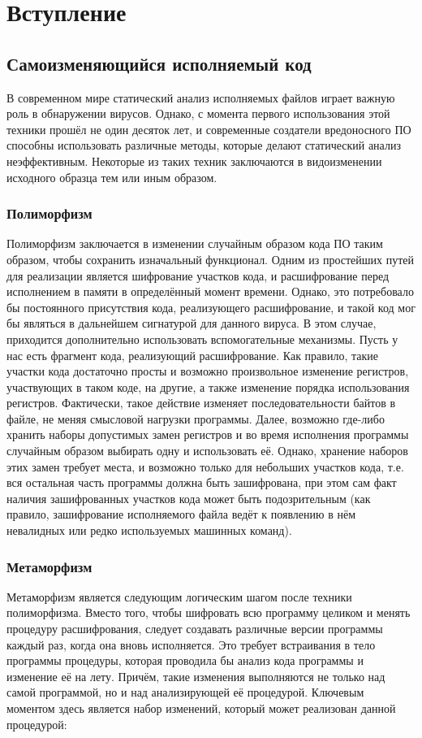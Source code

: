 \section {Вступление}
\subsection {Самоизменяющийся исполняемый код}
В современном мире статический анализ исполняемых файлов играет важную роль в обнаружении вирусов. Однако, с момента первого использования этой техники прошёл не один десяток лет, и современные создатели вредоносного ПО способны использовать  различные методы, которые делают статический анализ неэффективным. Некоторые из таких техник заключаются в видоизменении исходного образца тем или иным образом. 
\subsubsection {Полиморфизм}
Полиморфизм заключается в изменении случайным образом кода ПО таким образом, чтобы сохранить изначальный функционал. Одним из простейших путей для реализации является шифрование участков кода, и расшифрование перед исполнением в памяти в определённый момент времени. Однако, это потребовало бы постоянного присутствия кода, реализующего расшифрование, и такой код мог бы являться в дальнейшем сигнатурой для данного вируса. В этом случае, приходится дополнительно использовать вспомогательные механизмы. Пусть у нас есть фрагмент кода, реализующий расшифрование. Как правило, такие участки кода достаточно просты и возможно произвольное изменение регистров, участвующих в таком коде, на другие, а также изменение порядка использования регистров. Фактически, такое действие изменяет последовательности байтов в файле, не меняя смысловой нагрузки программы. Далее, возможно где-либо хранить наборы допустимых замен регистров и во время исполнения программы случайным образом выбирать одну и использовать её. Однако, хранение наборов этих замен требует места, и возможно только для небольших участков кода, т.е. вся остальная часть программы должна быть зашифрована, при этом сам факт наличия зашифрованных участков кода может быть подозрительным (как правило, зашифрование исполняемого файла ведёт к появлению в нём невалидных или редко используемых машинных команд).
\subsubsection {Метаморфизм}
Метаморфизм является следующим логическим шагом после техники полиморфизма. Вместо того, чтобы шифровать всю программу целиком и менять процедуру расшифрования, следует создавать различные версии программы каждый раз, когда она вновь исполняется. Это требует встраивания в тело программы процедуры, которая проводила бы анализ кода программы и изменение её на лету. Причём, такие изменения выполняются не только над самой программой, но и над анализирующей её процедурой. Ключевым моментом здесь является набор изменений, который может реализован данной процедурой:
\lstset{style=masm}

